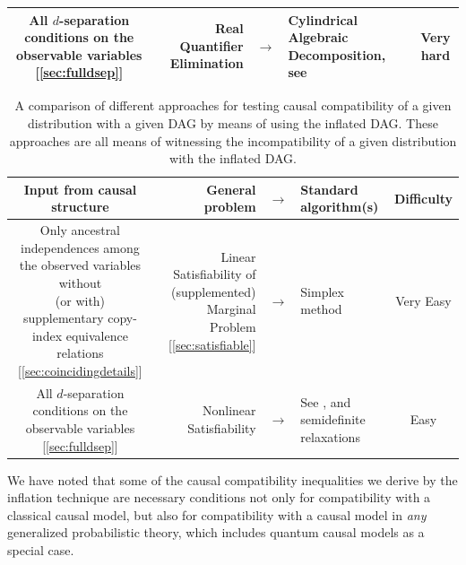 \begin{table}[ht]
\begin{tabularx}{\linewidth}{ |c|RlL|c| }
\parbox{5cm}{All $d$-separation conditions on the observable variables [\cref{sec:fulldsep}]} & Real Quantifier Elimination & $\to$ & Cylindrical Algebraic Decomposition, see \cite{ChavesPolynomial} & Very hard \\

\bottomrule
\end{tabularx}
\label{table:difficulties}
\end{table}


\begin{table}[ht]
\centering
\caption{A comparison of different approaches for testing causal compatibility of a given distribution with a given DAG by means of using the inflated DAG. These approaches are all means of witnessing the incompatibility of a given distribution with the inflated DAG.  
}
\begin{tabularx}{\linewidth}{ |c|RlL|c| } 
\toprule
Input from causal structure & General problem & $\to$ & Standard algorithm(s) & Difficulty \\
\midrule
\midrule
\parbox{5cm}{Only ancestral independences among the observed variables without \\(or with) supplementary copy-index equivalence relations [\cref{sec:coincidingdetails}]} & Linear Satisfiability of (supplemented) Marginal Problem [\cref{sec:satisfiable}] & $\to$ & Simplex method \cite{Korovin2012ImplementingCRA,Bobot2012SimplexSAT} & Very Easy \\
\hline
\parbox{5cm}{All $d$-separation conditions on the observable variables [\cref{sec:fulldsep}]} & Nonlinear Satisfiability & $\to$ & See \cite{BarFT-SMTLIB}, and semidefinite relaxations~\cite{laurent_polynomial_2012} & Easy \\
\bottomrule
\end{tabularx}
\label{table:satisfiabledifficulties}
\end{table}


We have noted that some of the causal compatibility inequalities we derive by the inflation technique are necessary conditions not only for compatibility with a classical causal model, but also 
for compatibility with a causal model in {\em any} generalized probabilistic theory, which includes quantum causal models as a special case.  


